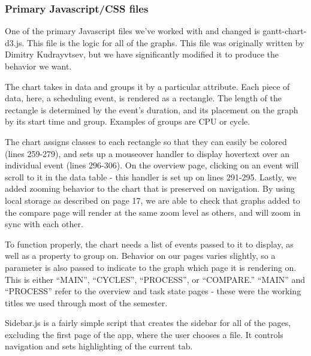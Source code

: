 \documentclass{hmcclinic}
\begin{document}
  \subsubsection{Primary Javascript/CSS files}
  One of the primary Javascript files we've worked
  with and changed is gantt-chart-d3.js. This file is the logic for all of the
  graphs. This file was originally written by Dimitry Kudrayvtsev, but we have
  significantly modified it to produce the behavior we want.

  The chart takes in data and groups it by a particular attribute. Each piece
  of data, here, a scheduling event, is rendered as a rectangle. The
  length of the rectangle is determined by the event's duration, and its
  placement on the graph by its start time and group. Examples of groups are
  CPU or cycle.

  The chart assigns classes to each rectangle so that they can easily be
  colored (lines 259-279), and sets up a mouseover handler to display hovertext
  over an individual event (lines 296-306). On the overview page, clicking
  on an event will scroll to it in the data table - this handler is set up on
  lines 291-295. Lastly, we added zooming behavior to the chart that is
  preserved on navigation. By using local storage as described on page 17, we
  are able to check that graphs added to the compare page will render at the
  same zoom level as others, and will zoom in sync with each other.

  To function properly, the chart needs a list of events passed to it to
  display, as well as a property to group on. Behavior on our pages varies
  slightly, so a parameter is also passed to indicate to the graph which
  page it is rendering on. This is either ``MAIN'', ``CYCLES'', ``PROCESS'',
  or ``COMPARE.'' ``MAIN'' and ``PROCESS'' refer to the overview and task
  state pages - these were the working titles we used through most of the
  semester.

  Sidebar.js is a fairly simple script that creates the sidebar for all of the
  pages, excluding the first page of the app, where the user chooses a file.
  It controls navigation and sets highlighting of the current tab.
\end{document}
